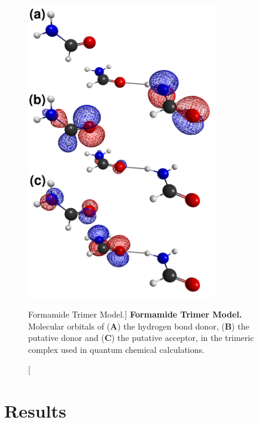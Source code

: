 \begin{figure}
\includegraphics[width=3.25in]{figs/npistar/04-orbitals.png}
\caption
      [Formamide Trimer Model.]{
  {\bf Formamide Trimer Model.}
  \\
  Molecular orbitals of ({\bf A}) the hydrogen bond donor, ({\bf B}) the
  putative \npipistar{} donor and ({\bf C}) the putative \npipistar{} acceptor,
  in the trimeric complex used in quantum chemical calculations.
}
\label{figure.11.4}
\end{figure}

\section{Results}

